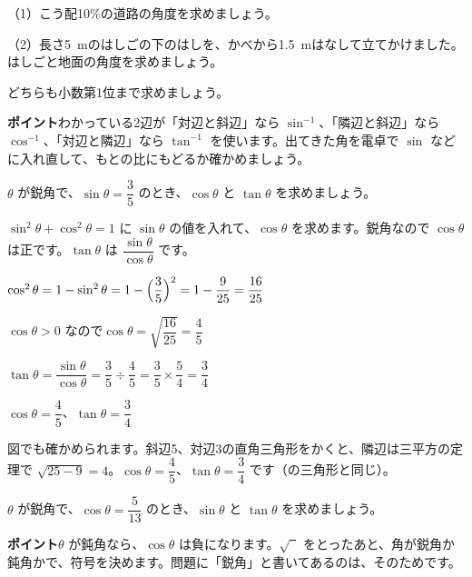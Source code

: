 \begin{jibun}
（1）こう配10\%の道路の角度を求めましょう。\par
（2）長さ\qty{5}{m}のはしごの下のはしを、かべから\qty{1.5}{m}はなして立てかけました。はしごと地面の角度を求めましょう。\par
どちらも小数第1位まで求めましょう。
\end{jibun}
\textbf{ポイント}\quad わかっている2辺が「対辺と斜辺」なら $\sin^{-1}$、「隣辺と斜辺」なら $\cos^{-1}$、「対辺と隣辺」なら $\tan^{-1}$ を使います。出てきた角を電卓で $\sin$ などに入れ直して、もとの比にもどるか確かめましょう。

\begin{reidai}
$\theta$ が鋭角で、$\sin\theta=\dfrac{3}{5}$ のとき、$\cos\theta$ と $\tan\theta$ を求めましょう。\par
\kangaekata $\sin^2\theta+\cos^2\theta=1$ に $\sin\theta$ の値を入れて、$\cos\theta$ を求めます。鋭角なので $\cos\theta$ は正です。$\tan\theta$ は $\dfrac{\sin\theta}{\cos\theta}$ です。\par
\shiki $\cos^2\theta=1-\sin^2\theta=1-\Bigl(\dfrac{3}{5}\Bigr)^2=1-\dfrac{9}{25}=\dfrac{16}{25}$\par
\hspace*{2.6\zw}$\cos\theta>0$ なので\quad $\cos\theta=\sqrt{\dfrac{16}{25}}=\dfrac{4}{5}$\par
\hspace*{2.6\zw}$\tan\theta=\dfrac{\sin\theta}{\cos\theta}=\dfrac{3}{5}\div\dfrac{4}{5}=\dfrac{3}{5}\times\dfrac{5}{4}=\dfrac{3}{4}$\par
\kotae $\cos\theta=\dfrac{4}{5}$、$\tan\theta=\dfrac{3}{4}$
\end{reidai}
図でも確かめられます。斜辺5、対辺3の直角三角形をかくと、隣辺は三平方の定理で $\sqrt{25-9}=4$。$\cos\theta=\dfrac{4}{5}$、$\tan\theta=\dfrac{3}{4}$ です（の三角形と同じ）。

\begin{jibun}
$\theta$ が鋭角で、$\cos\theta=\dfrac{5}{13}$ のとき、$\sin\theta$ と $\tan\theta$ を求めましょう。
\end{jibun}
\textbf{ポイント}\quad $\theta$ が鈍角なら、$\cos\theta$ は負になります。$\sqrt{\phantom{2}}$ をとったあと、角が鋭角か鈍角かで、符号を決めます。問題に「鋭角」と書いてあるのは、そのためです。

